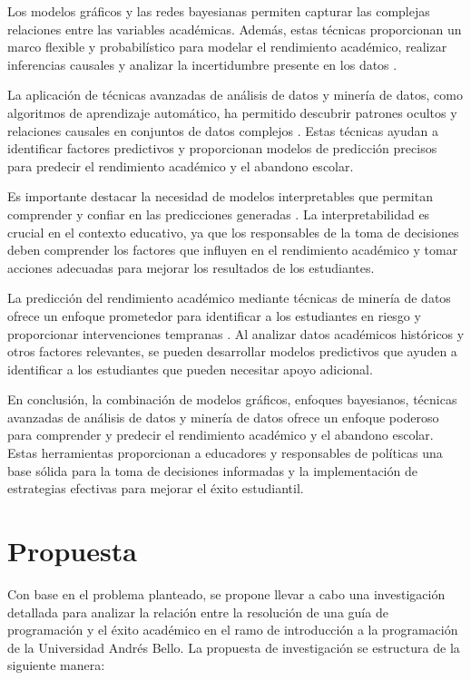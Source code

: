 Los modelos gráficos y las redes bayesianas permiten capturar las complejas relaciones entre las variables académicas. Además, 
estas técnicas proporcionan un marco flexible y probabilístico para modelar el rendimiento académico, realizar inferencias causales y 
analizar la incertidumbre presente en los datos \cite{jensen2001bayesian}.

La aplicación de técnicas avanzadas de análisis de datos y minería de datos, como algoritmos de aprendizaje automático, ha permitido descubrir patrones ocultos
y relaciones causales en conjuntos de datos complejos \cite{hair2019advanced, han2011data}. Estas técnicas ayudan a identificar factores predictivos y
proporcionan modelos de predicción precisos para predecir el rendimiento académico y el abandono escolar.

Es importante destacar la necesidad de modelos interpretables que permitan comprender y confiar en las predicciones generadas \cite{kocev2013need}.
La interpretabilidad es crucial en el contexto educativo, ya que los responsables de la toma de decisiones deben comprender los factores que influyen
en el rendimiento académico y tomar acciones adecuadas para mejorar los resultados de los estudiantes.

La predicción del rendimiento académico mediante técnicas de minería de datos ofrece un enfoque prometedor para identificar a los estudiantes en riesgo
y proporcionar intervenciones tempranas \cite{garcia2018prediccion, wang2017literature}. Al analizar datos académicos históricos y otros factores relevantes,
se pueden desarrollar modelos predictivos que ayuden a identificar a los estudiantes que pueden necesitar apoyo adicional.

En conclusión, la combinación de modelos gráficos, enfoques bayesianos, técnicas avanzadas de análisis de datos y minería de datos ofrece un enfoque poderoso
para comprender y predecir el rendimiento académico y el abandono escolar. Estas herramientas proporcionan a educadores y responsables de políticas una base
sólida para la toma de decisiones informadas y la implementación de estrategias efectivas para mejorar el éxito estudiantil.



\hypertarget{propuesta}{%
    \section{Propuesta}\label{propuesta}}


Con base en el problema planteado, se propone llevar a cabo una investigación detallada para analizar la relación entre la resolución de una guía de programación y el éxito académico en el ramo de introducción a la programación de la Universidad Andrés Bello. La propuesta de investigación se estructura de la siguiente manera:

